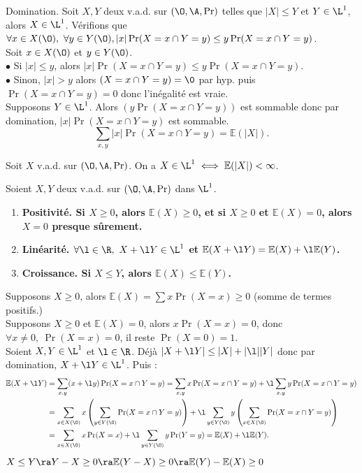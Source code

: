 \documentclass[11pt]{article}
\renewcommand*{\E}{\mathbb{E}}
\begin{document}
\begin{prop}{Domination.}{}
    Soit $X,Y$ deux v.a.d. sur $(\O,\A,\Pr)$ telles que $|X|\leq Y$ et $Y\in\L^1$, alors $X\in\L^1$.
    \tcblower
    Vérifions que $\forall x \in X(\O), ~ \forall y \in Y(\O), |x|\Pr(X=x\cap Y=y)\leq y\Pr(X=x\cap Y=y)$.\\
    Soit $x\in X(\O)$ et $y\in Y(\O)$.\\
    $\bullet$ Si $|x|\leq y$, alors $|x|\Pr(X=x\cap Y=y)\leq y\Pr(X=x\cap Y=y)$.\\
    $\bullet$ Sinon, $|x|>y$ alors $(X=x\cap Y=y)=\0$ par hyp. puis $\Pr(X=x\cap Y=y)=0$ donc l'inégalité est vraie.\\
    Supposons $Y\in\L^1$. Alors $(y\Pr(X=x\cap Y=y))$ est sommable donc par domination, $|x|\Pr(X=x\cap Y=y)$ est sommable.
    \begin{equation*}
        \sum_{x,y}|x|\Pr(X=x\cap Y=y)=\E(|X|).
    \end{equation*}
\end{prop}

\vspace*{-0.8cm}

\begin{prop}{}{}
    Soit $X$ v.a.d. sur $(\O,\A,\Pr)$. On a $X\in\L^1 \iff \E(|X|)<\infty$.
\end{prop}

\vspace*{-0.8cm}

\begin{prop}{}{}
    Soient $X,Y$ deux v.a.d. sur $(\O,\A,\Pr)$ dans $\L^1$.
    \begin{enumerate}
        \item \bf{Positivité.} Si $X\geq0$, alors $\E(X)\geq0$, et si $X\geq0$ et $\E(X)=0$, alors $X=0$ presque sûrement.
        \item \bf{Linéarité.} $\forall \l \in \R, ~ X + \l Y \in \L^1$ et $\E(X+\l Y) = \E(X) + \l\E(Y)$.
        \item \bf{Croissance.} Si $X\leq Y$, alors $\E(X) \leq \E(Y)$.
    \end{enumerate} 
    \tcblower
     Supposons $X\geq0$, alors $\E(X)=\sum x\Pr(X=x)\geq0$ (somme de termes positifs.)\\
    Supposons $X\geq0$ et $\E(X)=0$, alors $x\Pr(X=x)=0$, donc $\forall x \neq 0, ~ \Pr(X=x)=0$, il reste $\Pr(X=0)=1$.\\
     Soient $X,Y\in\L^1$ et $\l\in\R$. Déjà $|X+\l Y| \leq |X|+|\l||Y|$ donc par domination, $X+\l Y \in \L^1$. Puis :
    \begin{align*}
        \E(X+\l Y) &= \sum_{x,y}(x+\l y)\Pr(X=x\cap Y=y) = \sum_{x,y}x\Pr(X=x\cap Y=y) + \l \sum_{x,y}y\Pr(X=x\cap Y=y)\\
        &= \sum_{x\in X(\O)}x\left( \sum_{y\in Y(\O)} \Pr(X=x\cap Y=y) \right) + \l \sum_{y\in Y(\O)}y\left( \sum_{x\in X(\O)} \Pr(X=x \cap Y=y) \right)\\
        &= \sum_{x\in X(\O)}x\Pr(X=x) + \l \sum_{y\in Y(\O)}y\Pr(Y=y) = \E(X) + \l\E(Y).
    \end{align*}
     $X\leq Y \ra Y-X \geq 0 \ra \E(Y-X)\geq 0 \ra \E(Y) - \E(X) \geq 0$
\end{prop}
\end{document}

